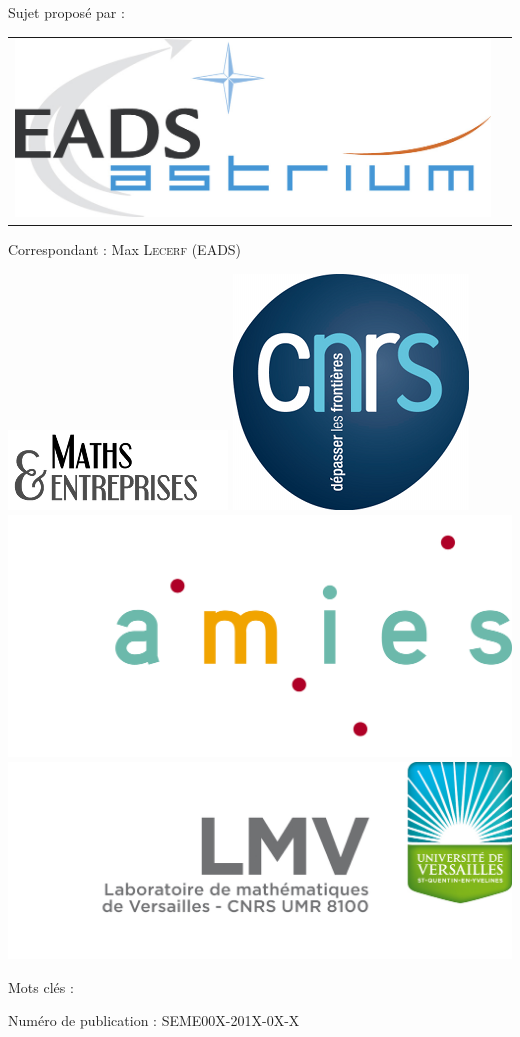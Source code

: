 \documentclass[a4paper,11pt]{article}
\numberwithin{section}{part}
\begin{document}
\hspace{1cm}Sujet propos\'e par :
\begin{center}
\begin{tabular}{cc}
\includegraphics[scale=.4]{LOGO_EADS_ASTRIUM.jpg} 
\end{tabular}
\end{center}
\begin{center}
  \large \sffamily Correspondant : Max \textsc{Lecerf} (EADS)
\end{center}
\vfill
\vspace{3cm}
\includegraphics[width=0.27\linewidth]{logo_GDR_ME} \hfill
\includegraphics[width=0.12\linewidth]{logo_CNRS} \hfill
\includegraphics[width=0.27\linewidth]{logo_AMIES} \hfill
\includegraphics[width=0.30\linewidth]{logo_LMV}

\newpage
 \setcounter{page}{0}
\thispagestyle{empty}
\begin{center}

\vfill
Mots clés :

\vfill
Num\'ero de publication : SEME00X-201X-0X-X
\end{center}
\newpage
\end{document}
